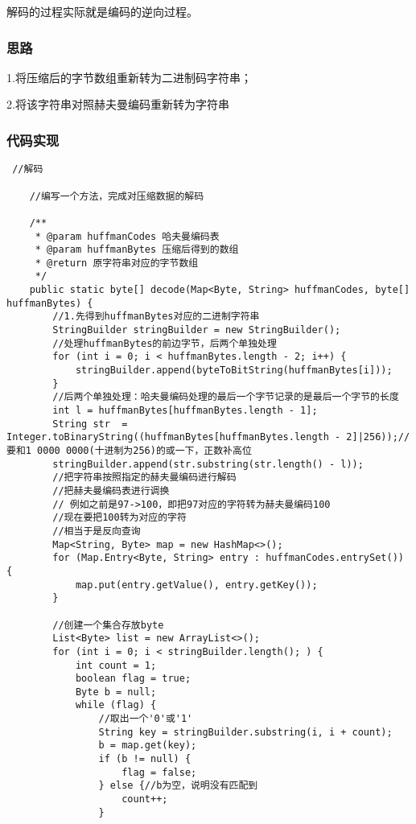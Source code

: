 \documentclass[a4paper]{report}
\begin{document}
解码的过程实际就是编码的逆向过程。

\subsubsection{思路}
1.将压缩后的字节数组重新转为二进制码字符串；

2.将该字符串对照赫夫曼编码重新转为字符串
\subsubsection{代码实现}
\begin{lstlisting}
 //解码

    //编写一个方法，完成对压缩数据的解码

    /**
     * @param huffmanCodes 哈夫曼编码表
     * @param huffmanBytes 压缩后得到的数组
     * @return 原字符串对应的字节数组
     */
    public static byte[] decode(Map<Byte, String> huffmanCodes, byte[] huffmanBytes) {
        //1.先得到huffmanBytes对应的二进制字符串
        StringBuilder stringBuilder = new StringBuilder();
        //处理huffmanBytes的前边字节，后两个单独处理
        for (int i = 0; i < huffmanBytes.length - 2; i++) {
            stringBuilder.append(byteToBitString(huffmanBytes[i]));
        }
        //后两个单独处理：哈夫曼编码处理的最后一个字节记录的是最后一个字节的长度
        int l = huffmanBytes[huffmanBytes.length - 1];
        String str  = Integer.toBinaryString((huffmanBytes[huffmanBytes.length - 2]|256));//要和1 0000 0000(十进制为256)的或一下，正数补高位
        stringBuilder.append(str.substring(str.length() - l));
        //把字符串按照指定的赫夫曼编码进行解码
        //把赫夫曼编码表进行调换
        // 例如之前是97->100，即把97对应的字符转为赫夫曼编码100
        //现在要把100转为对应的字符
        //相当于是反向查询
        Map<String, Byte> map = new HashMap<>();
        for (Map.Entry<Byte, String> entry : huffmanCodes.entrySet()) {
            map.put(entry.getValue(), entry.getKey());
        }

        //创建一个集合存放byte
        List<Byte> list = new ArrayList<>();
        for (int i = 0; i < stringBuilder.length(); ) {
            int count = 1;
            boolean flag = true;
            Byte b = null;
            while (flag) {
                //取出一个'0'或'1'
                String key = stringBuilder.substring(i, i + count);
                b = map.get(key);
                if (b != null) {
                    flag = false;
                } else {//b为空，说明没有匹配到
                    count++;
                }


\end{lstlisting}
\end{document}
